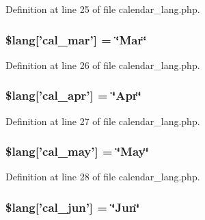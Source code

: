 Definition at line 25 of file calendar\-\_\-lang.\-php.

\hypertarget{calendar__lang_8php_a22ee24632deb286ad4efb833e2fe7533}{
\subsubsection[{\$lang}]{\setlength{\rightskip}{0pt plus 5cm}\$lang\mbox{[}'cal\-\_\-mar'\mbox{]} = \char`\"{}Mar\char`\"{}}}\label{calendar__lang_8php_a22ee24632deb286ad4efb833e2fe7533}


Definition at line 26 of file calendar\-\_\-lang.\-php.

\hypertarget{calendar__lang_8php_a61653bb502ac4775a4186ae145e9ff78}{
\subsubsection[{\$lang}]{\setlength{\rightskip}{0pt plus 5cm}\$lang\mbox{[}'cal\-\_\-apr'\mbox{]} = \char`\"{}Apr\char`\"{}}}\label{calendar__lang_8php_a61653bb502ac4775a4186ae145e9ff78}


Definition at line 27 of file calendar\-\_\-lang.\-php.

\hypertarget{calendar__lang_8php_a7e77a974617dd3fd0ab8d66f59125fdb}{
\subsubsection[{\$lang}]{\setlength{\rightskip}{0pt plus 5cm}\$lang\mbox{[}'cal\-\_\-may'\mbox{]} = \char`\"{}May\char`\"{}}}\label{calendar__lang_8php_a7e77a974617dd3fd0ab8d66f59125fdb}


Definition at line 28 of file calendar\-\_\-lang.\-php.

\hypertarget{calendar__lang_8php_aabea2be5e0612f96b8d388183c4a3ebb}{
\subsubsection[{\$lang}]{\setlength{\rightskip}{0pt plus 5cm}\$lang\mbox{[}'cal\-\_\-jun'\mbox{]} = \char`\"{}Jun\char`\"{}}}\label{calendar__lang_8php_aabea2be5e0612f96b8d388183c4a3ebb}


